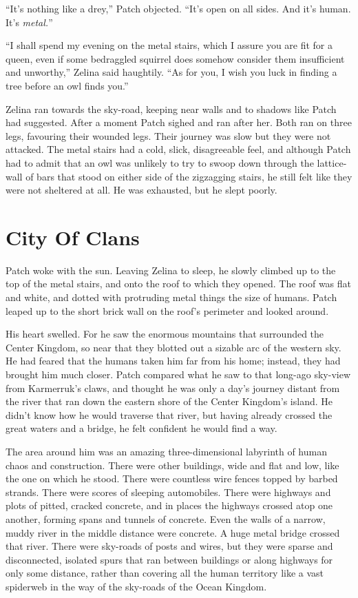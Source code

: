 \documentclass[ebook,oneside,openany,12pt]{memoir}
\begin{document}
“It’s nothing like a drey,” Patch objected. “It’s open on all
sides. And it’s human. It’s \emph{metal.}”

“I shall spend my evening on the metal stairs, which I assure you are
fit for a queen, even if some bedraggled squirrel does somehow
consider them insufficient and unworthy,” Zelina said haughtily. “As
for you, I wish you luck in finding a tree before an owl finds you.”

Zelina ran towards the sky-road, keeping near walls and to shadows
like Patch had suggested. After a moment Patch sighed and ran after
her. Both ran on three legs, favouring their wounded legs. Their
journey was slow but they were not attacked. The metal stairs had a
cold, slick, disagreeable feel, and although Patch had to admit that
an owl was unlikely to try to swoop down through the lattice-wall of
bars that stood on either side of the zigzagging stairs, he still felt
like they were not sheltered at all. He was exhausted, but he slept
poorly.


\section{City Of Clans}

Patch woke with the sun. Leaving Zelina to sleep, he slowly climbed up
to the top of the metal stairs, and onto the roof to which they
opened. The roof was flat and white, and dotted with protruding metal
things the size of humans. Patch leaped up to the short brick wall on
the roof’s perimeter and looked around.

His heart swelled. For he saw the enormous mountains that surrounded
the Center Kingdom, so near that they blotted out a sizable arc of the
western sky. He had feared that the humans taken him far from his
home; instead, they had brought him much closer. Patch compared what
he saw to that long-ago sky-view from Karmerruk’s claws, and thought
he was only a day’s journey distant from the river that ran down the
eastern shore of the Center Kingdom’s island. He didn’t know how he
would traverse that river, but having already crossed the great waters
and a bridge, he felt confident he would find a way.

The area around him was an amazing three-dimensional labyrinth of
human chaos and construction. There were other buildings, wide and
flat and low, like the one on which he stood. There were countless
wire fences topped by barbed strands. There were scores of sleeping
automobiles. There were highways and plots of pitted, cracked
concrete, and in places the highways crossed atop one another, forming
spans and tunnels of concrete. Even the walls of a narrow, muddy river
in the middle distance were concrete. A huge metal bridge crossed that
river. There were sky-roads of posts and wires, but they were sparse
and disconnected, isolated spurs that ran between buildings or along
highways for only some distance, rather than covering all the human
territory like a vast spiderweb in the way of the sky-roads of the
Ocean Kingdom.
\end{document}
